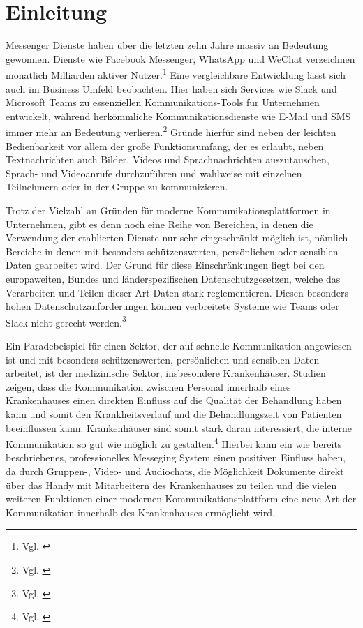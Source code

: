 \chapter{Einleitung}\label{chapter:einleitung}

Messenger Dienste haben über die letzten zehn Jahre massiv an Bedeutung gewonnen. Dienste wie Facebook Messenger, WhatsApp und WeChat verzeichnen monatlich Milliarden aktiver Nutzer.\footnote{Vgl. \cite{Ballve2014}} Eine vergleichbare Entwicklung lässt sich auch im Business Umfeld beobachten. Hier haben sich Services wie Slack und Microsoft Teams zu essenziellen Kommunikations-Tools für Unternehmen entwickelt, während herkömmliche Kommunikationsdienste wie E-Mail und SMS immer mehr an Bedeutung verlieren.\footnote{Vgl. \cite{Richter2019}}
Gründe hierfür sind neben der leichten Bedienbarkeit vor allem der große Funktionsumfang, der es erlaubt, neben Textnachrichten auch Bilder, Videos und Sprachnachrichten auszutauschen, Sprach- und Videoanrufe durchzuführen und wahlweise mit einzelnen Teilnehmern oder in der Gruppe zu kommunizieren.

Trotz der Vielzahl an Gründen für moderne Kommunikationsplattformen in Unternehmen, gibt es denn noch eine Reihe von Bereichen, in denen die Verwendung der etablierten Dienste nur sehr eingeschränkt möglich ist, nämlich Bereiche in denen mit besonders schützenswerten, persönlichen oder sensiblen Daten gearbeitet wird. Der Grund für diese Einschränkungen liegt bei den europaweiten, Bundes und länderspezifischen Datenschutzgesetzen, welche das Verarbeiten und Teilen dieser Art Daten stark reglementieren. Diesen besonders hohen Datenschutzanforderungen können verbreitete Systeme wie Teams oder Slack nicht gerecht werden.\footnote{Vgl. \cite{Datenschutzkonferenz2019}}

Ein Paradebeispiel für einen Sektor, der auf schnelle Kommunikation angewiesen ist und mit besonders schützenswerten, persönlichen und sensiblen Daten arbeitet, ist der medizinische Sektor, insbesondere Krankenhäuser. Studien zeigen, dass die Kommunikation zwischen Personal innerhalb eines Krankenhauses einen direkten Einfluss auf die Qualität der Behandlung haben kann und somit den Krankheitsverlauf und die Behandlungszeit von Patienten beeinflussen kann. Krankenhäuser sind somit stark daran interessiert, die interne Kommunikation so gut wie möglich zu gestalten.\footnote{Vgl. \cite{G.Murphy2010}} Hierbei kann ein wie bereits beschriebenes, professionelles Messeging System einen positiven Einfluss haben, da durch Gruppen-, Video- und Audiochats, die Möglichkeit Dokumente direkt über das Handy mit Mitarbeitern des Krankenhauses zu teilen und die vielen weiteren Funktionen einer modernen Kommunikationsplattform eine neue Art der Kommunikation innerhalb des Krankenhauses ermöglicht wird. 

